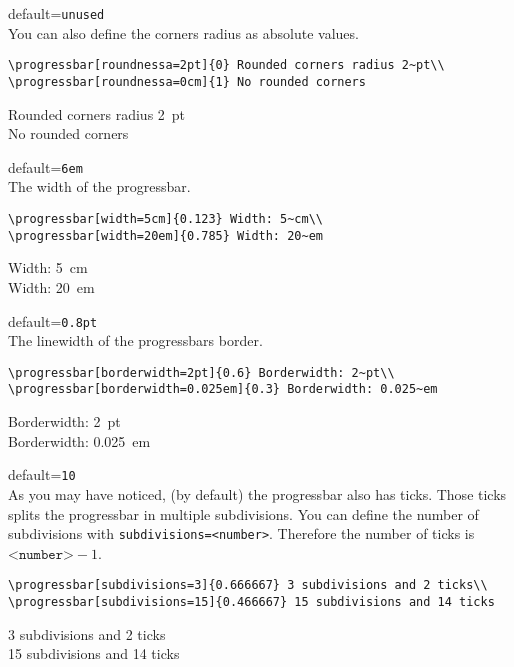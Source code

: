 \documentclass{ltxdoc}
\begin{document}
 default=\texttt{unused}\\
	You can also define the corners radius as absolute values.
\begin{lstlisting}
\progressbar[roundnessa=2pt]{0} Rounded corners radius 2~pt\\
\progressbar[roundnessa=0cm]{1} No rounded corners
\end{lstlisting}
	 Rounded corners radius 2~pt\\
	 No rounded corners

 default=\texttt{6em}\\
	The width of the progressbar.
\begin{lstlisting}
\progressbar[width=5cm]{0.123} Width: 5~cm\\
\progressbar[width=20em]{0.785} Width: 20~em
\end{lstlisting}
	 Width: 5~cm\\
	 Width: 20~em

 default=\texttt{0.8pt}\\
	The linewidth of the progressbars border.
\begin{lstlisting}
\progressbar[borderwidth=2pt]{0.6} Borderwidth: 2~pt\\
\progressbar[borderwidth=0.025em]{0.3} Borderwidth: 0.025~em
\end{lstlisting}
	 Borderwidth: 2~pt\\
	 Borderwidth: 0.025~em

 default=\texttt{10}\\
	As you may have noticed, (by default) the progressbar also has ticks. Those ticks splits the progressbar in multiple subdivisions. You can define the number of subdivisions with \texttt{subdivisions=<number>}. Therefore the number of ticks is $\texttt{<number>}-1$.
\begin{lstlisting}
\progressbar[subdivisions=3]{0.666667} 3 subdivisions and 2 ticks\\
\progressbar[subdivisions=15]{0.466667} 15 subdivisions and 14 ticks
\end{lstlisting}
	 3 subdivisions and 2 ticks\\
	 15 subdivisions and 14 ticks
\end{document}
